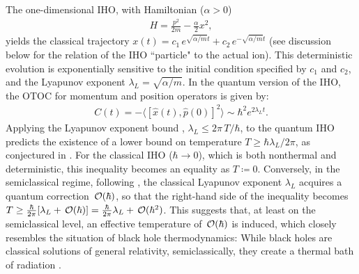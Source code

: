 \documentclass[prl,twocolumn,superscriptaddress,floatfix,showpacs,amsmath,longbibliography,nofootinbib,amssymb]{revtex4-1}
\begin{document}
The one-dimensional IHO, with Hamiltonian ($\alpha >0$)
 \begin{eqnarray}\label{Hamiltonian}
H=\frac{{p}^2}{2m}-\frac{\alpha}{2}{x}^2, 
\end{eqnarray}
yields the classical trajectory 
$x(t)=c_1\,e^{\sqrt{\alpha/m}t}+c_2\,e^{-\sqrt{\alpha/m}t}$ (see discussion below for the relation of the  IHO ``particle" to the actual ion).
This deterministic evolution is exponentially sensitive to the initial condition specified by $c_1$ and $c_2$, 
and the Lyapunov exponent $\lambda_L=\sqrt{\alpha/m}$.  
In the quantum version of the IHO, the OTOC 
for momentum and position operators is given by: 
\begin{eqnarray}\label{OTOC}
C(t)=-\langle[\hat{x}(t),\hat{p}(0)]^2\rangle\sim\hbar^2e^{2\lambda_Lt}. 
\end{eqnarray}
Applying the Lyapunov exponent bound  \cite{bound}, $\lambda_L\leq2\pi\,T/\hbar$, to the 
quantum IHO predicts the existence of a lower bound on temperature 
$T\geq\hbar\lambda_L/2\pi$, as conjectured in \cite{PhysRevLett.122.101603}. 
For the classical IHO ($\hbar\rightarrow 0$), which is both nonthermal and deterministic, 
this inequality becomes an equality as $T\coloneqq 0$.  
Conversely, in the semiclassical regime, following \cite{PhysRevLett.122.101603},  
the classical Lyapunov exponent $\lambda_L$ acquires a 
quantum correction ${\cal\,O}(\hbar)$, so that the right-hand side of the inequality 
becomes $T\geq\frac{\hbar}{2\pi}[\lambda_L+{\cal\,O}(\hbar)]=\frac{\hbar}{2\pi}\lambda_L+{\cal\,O}(\hbar^2)$. 
This suggests that, at least on the semiclassical level, an effective temperature 
of ${\cal\,O}(\hbar)$ is induced, which closely resembles the situation of black hole thermodynamics: While black holes are classical solutions of general relativity, semiclassically, they create a thermal bath of radiation 
 \cite{Hawking1, Hawking1975}. 
\end{document}
